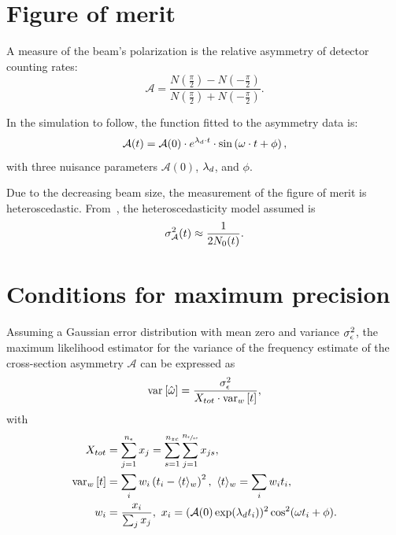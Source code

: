 \documentclass{jacow}
\begin{document}
\section{Figure of merit}
\newcommand{\Asym}{\mathcal{A}}
A measure of the beam's polarization is the relative asymmetry of detector counting rates:~\cite[p.~17]{Eversmann}
\begin{equation}\label{eq:AsymDef}
	\Asym = \frac{N(\frac\pi2) - N(-\frac\pi2)}{N(\frac\pi2)+N(-\frac\pi2)}.
\end{equation}

In the simulation to follow, the function fitted to the asymmetry data is:
\begin{equation}\label{eq:xFOM}
	\Asym(t) = \Asym(0)\cdot e^{\lamd\cdot t}\cdot\sin\bkt{\omega\cdot t + \phi},
\end{equation}
with three nuisance parameters $\Asym(0)$, $\lambda_d$, and $\phi$. 

Due to the decreasing beam size, the measurement of the figure of merit is heteroscedastic. From~\cite[p.~18]{Eversmann}, the heteroscedasticity model assumed is
\begin{equation}\label{eq:AsymHtsk}
	\SD{\Asym}^2(t) \approx \frac{1}{2N_0(t)}.
\end{equation}

\section{Conditions for maximum precision}
\newcommand{\dtnd}{\dt_{zc}}
\newcommand{\SNR}{\text{SNR}}
\newcommand{\deq}{\overset{\triangle}{=}}

Assuming a Gaussian error distribution with mean zero and variance $\SD{\meas}^2$, the maximum likelihood estimator for the variance of the frequency estimate of the cross-section asymmetry $\Asym$ can be expressed as
\[\var{\hat\omega} = \frac{\SD{\meas}^2}{X_{tot}\cdot \var[w]{t}}, \]
with
\begin{align*}
X_{tot} &= \sum_{j=1}^{\Nm} x_j = \sum_{s=1}^{\Nnd}\sum_{j=1}^{\Nmnd} x_{js}, \\
\var[w]{t} &= \sum_i w_i \bkt{t_i - \avg{t}[w]}^2,~ \avg{t}[w] = \sum_i w_i t_i, \\
w_i &= \frac{x_i}{\sum_j x_j},~ x_i = (\Asym(0)\exp(\lamd t_i))^2\cos^2(\omega t_i + \phi). %
\end{align*}
\end{document}
